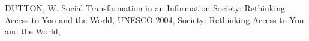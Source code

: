 \documentclass[
12pt,		%
openright,	%
twoside,  %
a4paper,			%
chapter=TITLE,		%
english,			%
french,				%
spanish,			%
brazil				%
]{USPSC-classe/USPSC}
\begin{document}
\begin{flushleft}
\begin{flushleft}
\begin{flushleft}
\begin{flushleft}
\begin{flushleft}
\begin{flushleft}
\begin{flushleft}
\begin{flushleft}
\begin{flushleft}
\begin{flushleft}
\begin{flushleft}
\begin{flushleft}
\begin{flushleft}
\begin{flushleft}
\begin{flushleft}
\begin{flushleft}
\begin{flushleft}
[DUTTON, 2004] DUTTON, W. Social Transformation in an Information Society: Rethinking Access to You and the World, UNESCO 2004, Society: Rethinking Access to You and the World, 
\end{flushleft}


\end{flushleft}


\end{flushleft}


\end{flushleft}


\end{flushleft}


\end{flushleft}


\end{flushleft}


\end{flushleft}


\end{flushleft}


\end{flushleft}


\end{flushleft}


\end{flushleft}


\end{flushleft}


\end{flushleft}


\end{flushleft}


\end{flushleft}


\end{flushleft}
\end{document}
